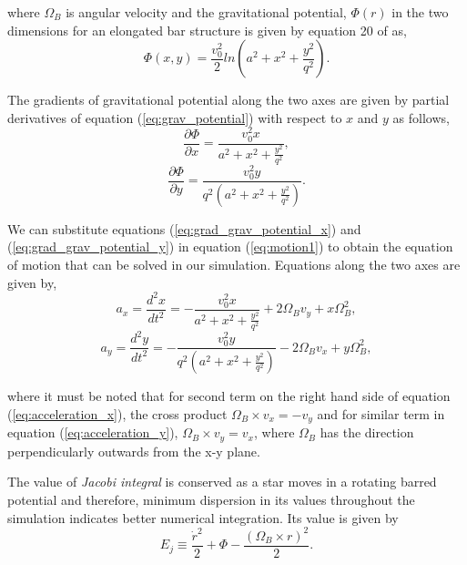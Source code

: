 \documentclass[a4paper]{article}
\begin{document}
	where \(\Omega_B\) is angular velocity and the gravitational potential, \(\Phi (r)\) in the two dimensions for an elongated bar structure is given by equation 20 of \cite{lecture_3} as,
	\begin{equation}
		\Phi(x,y)=\frac{v_0^2}{2} ln(a^2+x^2+\frac{y^2}{q^2}). 
		\label{eq:grav_potential}
	\end{equation}
	
	The gradients of gravitational potential along the two axes are given by partial derivatives of equation (\ref{eq:grav_potential}) with respect to \(x\) and \(y\) as follows,
	\begin{equation}
		\frac{\partial \Phi}{\partial x} = \frac{v_0^2 x}{a^2+x^2+\frac{y^2}{q^2}},
		\label{eq:grad_grav_potential_x}
	\end{equation}
	\begin{equation}
		\frac{\partial \Phi}{\partial y} = \frac{v_0^2 y}{q^2(a^2+x^2+\frac{y^2}{q^2})}.
		\label{eq:grad_grav_potential_y}
	\end{equation}
	
	We can substitute equations (\ref{eq:grad_grav_potential_x}) and (\ref{eq:grad_grav_potential_y}) in equation (\ref{eq:motion1}) to obtain the equation of motion that can be solved in our simulation. Equations along the two axes are given by,
	\begin{equation}
		a_x = \frac{d^2x}{dt^2} = - \frac{v_0^2 x}{a^2+x^2+\frac{y^2}{q^2}} + 2\Omega_B v_y + x \Omega_B^2 ,
		\label{eq:acceleration_x}
	\end{equation}
	\begin{equation}
		a_y = \frac{d^2y}{dt^2} = - \frac{v_0^2 y}{q^2(a^2+x^2+\frac{y^2}{q^2})} - 2\Omega_B v_x + y \Omega_B^2,
		\label{eq:acceleration_y}
	\end{equation}
	
	where it must be noted that for second term on the right hand side of equation (\ref{eq:acceleration_x}), the cross product \(\Omega_B \times v_x = -v_y\) and for similar term in equation (\ref{eq:acceleration_y}), \(\Omega_B \times v_y = v_x\), where \(\Omega_B\) has the direction perpendicularly outwards from the x-y plane.
	
	The value of \emph{Jacobi integral} is conserved as a star moves in a rotating barred potential and  therefore, minimum dispersion in its values throughout the simulation indicates better numerical integration. Its value is given by 
	\begin{equation}
		E_j \equiv \frac{\dot r^2}{2} + \Phi -\frac{(\Omega_B \times r)^2}{2}.
		\label{eq:jacobi_integral}
	\end{equation}
	
\end{document}
